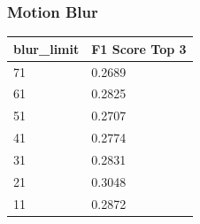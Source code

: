 \subsubsection{Motion Blur}
\begin{table}[!ht]
    \centering
    \begin{tabular}{|l|l|}
    \hline
        blur\_limit & F1 Score Top 3 \\ \hline
        71 & 0.2689 \\ \hline
        61 & 0.2825 \\ \hline
        51 & 0.2707 \\ \hline
        41 & 0.2774 \\ \hline
        31 & 0.2831 \\ \hline
        21 & 0.3048 \\ \hline
        11 & 0.2872 \\ \hline
    \end{tabular}
\end{table}